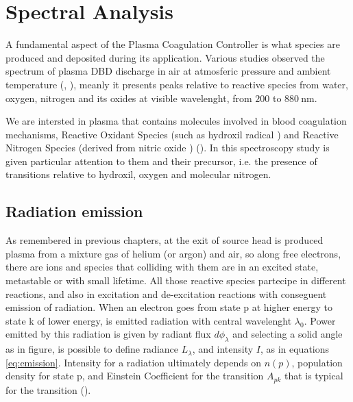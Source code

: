 \chapter{Spectral Analysis}
\label{ch:spettro}
A fundamental aspect of the Plasma Coagulation Controller is what species are produced and deposited during its application. Various studies observed the spectrum of plasma DBD discharge in air at atmosferic pressure and ambient temperature (\cite{DBDair_Trot}, \cite{DBDAirTypicalSpec}), meanly it presents peaks relative to reactive species from water, oxygen, nitrogen and its oxides at visible wavelenght, from $\num{200}$ to $\SI{880}{\nano\meter}$.

We are intersted in plasma that contains molecules involved in blood coagulation mechanisms, Reactive Oxidant Species (such as hydroxil radical ) and Reactive Nitrogen Species (derived from nitric oxide ) (\cite{6153386}). In this spectroscopy study is given particular attention to them and their precursor, i.e. the presence of transitions relative to hydroxil, oxygen and molecular nitrogen.


\section{Radiation emission}
As remembered in previous chapters, at the exit of source head is produced plasma from a mixture gas of helium (or argon) and air, so along free electrons, there are ions and species that colliding with them are in an excited state, metastable or with small lifetime. All those reactive species partecipe in different reactions, and also in excitation and de-excitation reactions with conseguent emission of radiation. When an electron goes from state p at higher energy to state k of lower energy, is emitted radiation with central wavelenght $\lambda_0$. Power emitted by this radiation is given by radiant flux $d\phi_{\lambda}$ and selecting a solid angle as in figure, is possible to define radiance $L_{\lambda}$, and intensity $I$, as in equations \ref{eq:emission}. Intensity for a radiation ultimately depends on $n(p)$, population density for state p, and Einstein Coefficient for the transition $A_{pk}$ that is typical for the transition (\cite{book:291477}).


